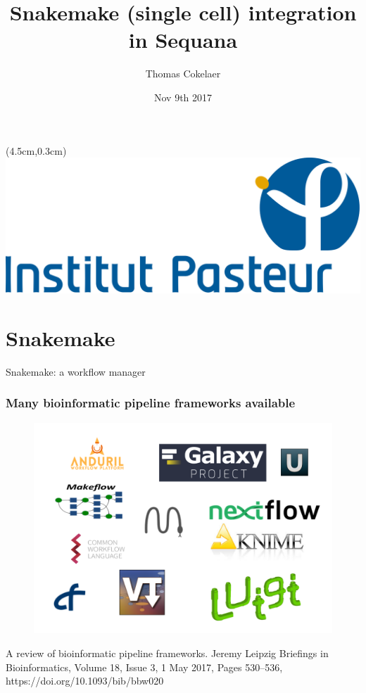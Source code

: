 \documentclass{beamer}
\title{ Snakemake (single cell) integration in Sequana}
\author[T.Cokelaer]{Thomas Cokelaer}
\institute{Institut Pasteur}
\date{Nov 9th 2017\\}
\begin{document}

\begin{frame}[plain]
    \titlepage
    \begin{textblock*}{5cm}(4.5cm,0.3cm)
        \includegraphics[scale=0.09]{images/Institut_Pasteur.png}
    \end{textblock*}
\end{frame}




\section{Snakemake}

\begin{frame}[plain]
 \centering
 \begin{Huge}
 Snakemake: a workflow manager
 \end{Huge}
\end{frame}



\begin{frame}
\frametitle{Many bioinformatic pipeline frameworks available}
\centering
 \begin{figure}
 \includegraphics[scale=0.23]{images/workflows.png}
 \end{figure}
 A review of bioinformatic pipeline frameworks. Jeremy Leipzig
Briefings in Bioinformatics, Volume 18, Issue 3, 1 May 2017, Pages 530–536, 
https://doi.org/10.1093/bib/bbw020

 \end{frame}
\end{document}
